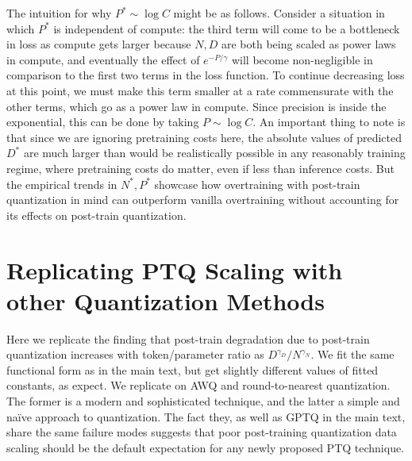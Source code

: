 \documentclass[11pt]{article}
\begin{document}
The intuition for why $P^* \sim \log C$ might be as follows. Consider a situation in which $P^*$ is independent of compute: the third term will come to be a bottleneck in loss as compute gets larger because $N, D$ are both being scaled as power laws in compute, and eventually the effect of $e^{-P/\gamma}$ will become non-negligible in comparison to the first two terms in the loss function. To continue decreasing loss at this point, we must make this term smaller at a rate commensurate with the other terms, which go as a power law in compute. Since precision is inside the exponential, this can be done by taking $P \sim \log C$. An important thing to note is that since we are ignoring pretraining costs here, the absolute values of predicted $D^*$ are much larger than would be realistically possible in any reasonably training regime, where pretraining costs do matter, even if less than inference costs. But the empirical trends in $N^*, P^*$ showcase how overtraining with post-train quantization in mind can outperform vanilla overtraining without accounting for its effects on post-train quantization. 



\section{Replicating PTQ Scaling with other Quantization Methods}
\label{appdx:rtn}

Here we replicate the finding that post-train degradation due to post-train quantization increases with token/parameter ratio as $D^{\gamma_D}/N^{\gamma_N}$. We fit the same functional form as in the main text, but get slightly different values of fitted constants, as expect. We replicate on AWQ \citep{lin2023awq} and round-to-nearest quantization. The former is a modern and sophisticated technique, and the latter a simple and naïve approach to quantization. The fact they, as well as GPTQ in the main text, share the same failure modes suggests that poor post-training quantization data scaling should be the default expectation for any newly proposed PTQ technique. 

\end{document}
